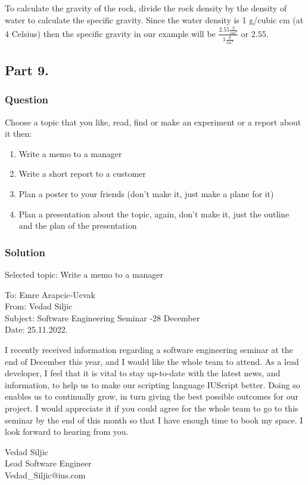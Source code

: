 \documentclass[a4paper, 10pt]{article}
\newcommand{\volumeUnit}[0]{\frac{g}{cm^{3}}}
\begin{document}
				\noindent To calculate the gravity of the rock, divide the rock density by the density of water to calculate the specific gravity. Since the water density is 1 g/cubic cm (at 4 Celsius) then the specific gravity in our example will be $\frac{2.55\volumeUnit}{1\volumeUnit}$ or $2.55$.
				
		\subsection{Part 9.}
			\subsubsection{Question}
				\noindent Choose a topic that you like, read, find or make an experiment or a report about it then:
				\begin{enumerate}
					\item Write a memo to a manager
					\item Write a short report to a customer
					\item Plan a poster to your friends (don’t make it, just make a plane for it)
					\item Plan a presentation about the topic, again, don’t make it, just the outline and the plan of the presentation
				\end{enumerate}
			\subsubsection{Solution}
				\noindent Selected topic: Write a memo to a manager
				\begin{tcolorbox}[colback=red!5!white,colframe=red!75!black,title=Memo To My Manager]
					To: Emre Arapcic-Uevak\\
					From: Vedad Siljic\\
					Subject: Software Engineering Seminar -28 December\\
					Date: 25.11.2022.\\
					\hspace{3mm}
					
					I recently received information regarding a software engineering seminar at the end of December this year, and I would like the whole team to attend.
					As a lead developer, I feel that it is vital to stay up-to-date with the latest news, and information, to help us to make our scripting language IUScript better. Doing so enables us to continually grow, in turn giving the best possible outcomes for our project.
					I would appreciate it if you could agree for the whole team to go to this seminar by the end of this month so that I have enough time to book my space.
					I look forward to hearing from you.
					
					\tcblower
					Vedad Siljic\\
					Lead Software Engineer\\
					Vedad\_Siljic@ius.com				
				\end{tcolorbox}
		\pagebreak
\end{document}
